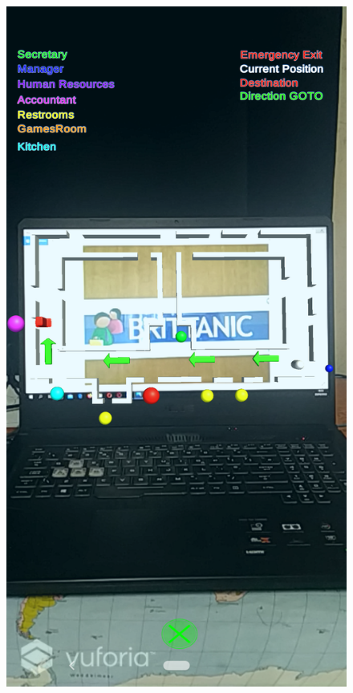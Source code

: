 \documentclass{aifyp}
\begin{document}
\begin{appendices}
\begin{figure}[H]
\begin{minipage}{.5\textwidth}
          \label{fig:Details}
        \end{minipage}
\end{figure}
\begin{figure}[H]
    \centering
        \begin{minipage}{.5\textwidth}
          \centering
          \includegraphics[scale=0.2]{Images/Chapter5/Impl10.png}

\end{minipage}
\end{figure}
\end{appendices}
\end{document}

